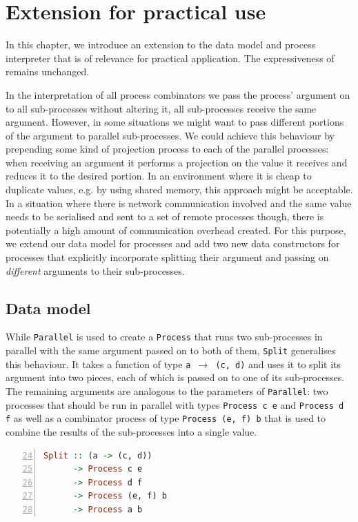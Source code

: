 \section{Extension for practical use}
In this chapter, we introduce an extension to the data model and process interpreter that is of relevance for practical application. The expressiveness of remains unchanged.

In the interpretation of all process combinators we pass the process' argument on to all sub-processes without altering it, all sub-processes receive the same argument. However, in some situations we might want to pass different portions of the argument to parallel sub-processes. We could achieve this behaviour by prepending some kind of projection process to each of the parallel processes: when receiving an argument it performs a projection on the value it receives and reduces it to the desired portion. In an environment where it is cheap to duplicate values, e.g. by using shared memory, this approach might be acceptable. In a situation where there is network communication involved and the same value needs to be serialised and sent to a set of remote processes though, there is potentially a high amount of communication overhead created. For this purpose, we extend our data model for processes and add two new data constructors for processes that explicitly incorporate splitting their argument and passing on \textit{different} arguments to their sub-processes. 

\subsection{Data model}
While \texttt{Parallel} is used to create a \texttt{Process} that runs two sub-processes in parallel with the same argument passed on to both of them, \texttt{Split} generalises this behaviour. It takes a function of type \texttt{a $\to$ (c, d)} and uses it to split its argument into two pieces, each of which is passed on to one of its sub-processes. The remaining arguments are analogous to the parameters of \texttt{Parallel}: two processes that should be run in parallel with types \texttt{Process c e} and \texttt{Process d f} as well as a combinator process of type \texttt{Process (e, f) b} that is used to combine the results of the sub-processes into a single value.
\begin{lstlisting}[language=Haskell,caption=Signature of the \texttt{Split} data constructor.,numbers=left,frame=bt,firstnumber=24]
Split :: (a -> (c, d))
      -> Process c e
      -> Process d f
      -> Process (e, f) b
      -> Process a b
\end{lstlisting}

